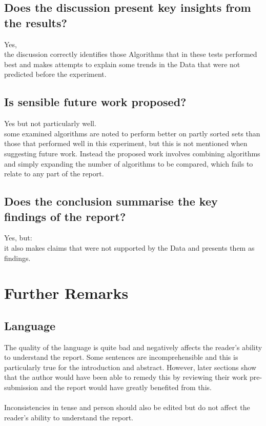 \documentclass{article}
\begin{document}
      \subsection{ Does the discussion present key insights from the results?}
        Yes,
        \\
        the discussion correctly identifies those Algorithms that in these tests performed best and makes attempts to explain some trends in the Data that were not predicted before the experiment.
      \subsection{ Is sensible future work proposed?}
        Yes but not particularly well.
        \\
        some examined algorithms are noted to perform better on partly sorted sets than those that performed well in this experiment, but this is not mentioned when suggesting future work. Instead the proposed work involves combining algorithms and simply expanding the number of algorithms to be compared, which fails to relate to any part of the report.
      \subsection{ Does the conclusion summarise the key findings of the report?      }
        Yes, but:
        \\
        it also makes claims that were not supported by the Data and presents them as findings.
  \section{Further Remarks}
    \subsection{Language}
      The quality of the language is quite bad and negatively affects the reader's ability to understand the report. Some sentences are incomprehensible and this is particularly true for the introduction and abstract. However, later sections show that the author would have been able to remedy this by reviewing their work pre-submission and the report would have greatly benefited from this.
      \\\\
      Inconsistencies in tense and person should also be edited but do not affect the reader's ability to understand the report.
\end{document}
